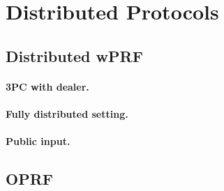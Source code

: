 
\section{Distributed Protocols}

\subsection{Distributed wPRF}

\paragraph{3PC with dealer.}

\paragraph{Fully distributed setting.}

\paragraph{Public input.}

\subsection{OPRF}